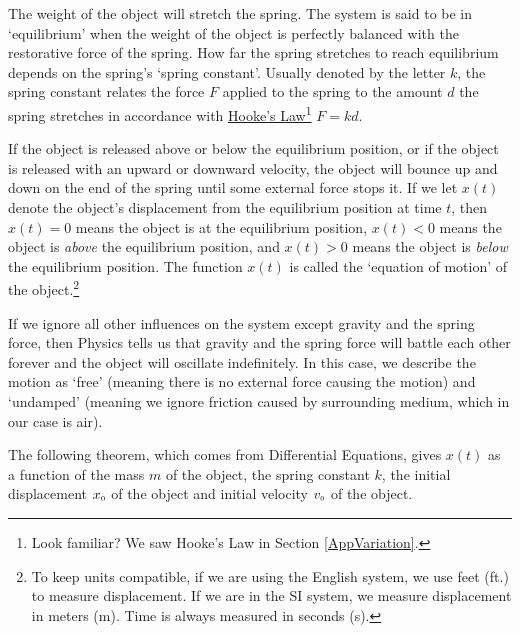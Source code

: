 \documentclass{ximera}
\begin{document}
The weight of the object will stretch the spring.   The system is said to be in `equilibrium' when the weight of the object is perfectly balanced with the restorative force of the spring.  How far the spring stretches to reach equilibrium depends on the spring's `spring constant'. Usually denoted by the letter $k$, the spring constant relates the force $F$ applied to the spring to the amount $d$ the spring stretches in accordance with \href{http://en.wikipedia.org/wiki/Hooke's_law}{\underline{Hooke's Law}}\footnote{Look familiar?  We saw Hooke's Law in Section \ref{AppVariation}.} $F = kd$.  

\smallskip

If the object is released above or below the equilibrium position, or if the object is released with an upward or downward velocity, the object will bounce up and down on the end of the spring until some external force stops it.  If we let $x(t)$ denote the object's displacement from the equilibrium position at time $t$, then $x(t) = 0$ means the object is at the equilibrium position, $x(t) < 0$ means the object is \textit{above} the equilibrium position, and $x(t) > 0$ means the object is \textit{below} the equilibrium position.  The function $x(t)$ is called the `equation of motion' of the object.\footnote{To keep units compatible, if we are using the English system, we use feet (ft.) to measure displacement.  If we are in the SI system, we measure displacement in meters (m). Time is always measured in seconds (s).}

\smallskip


If we ignore all other influences on the system except gravity and the spring force, then Physics tells us that gravity and the spring force will battle each other forever and the object will oscillate indefinitely.  In this case, we describe the motion as `free' (meaning there is no external force causing the motion) and `undamped' (meaning we ignore friction caused by surrounding medium, which in our case is air).  

\smallskip

The following theorem, which comes from Differential Equations, gives $x(t)$ as a function of the mass $m$ of the object, the spring constant $k$, the initial displacement $x_{\text{\tiny $0$}}$ of the object and initial velocity $v_{\text{\tiny $0$}}$ of the object.  

\smallskip
\end{document}
